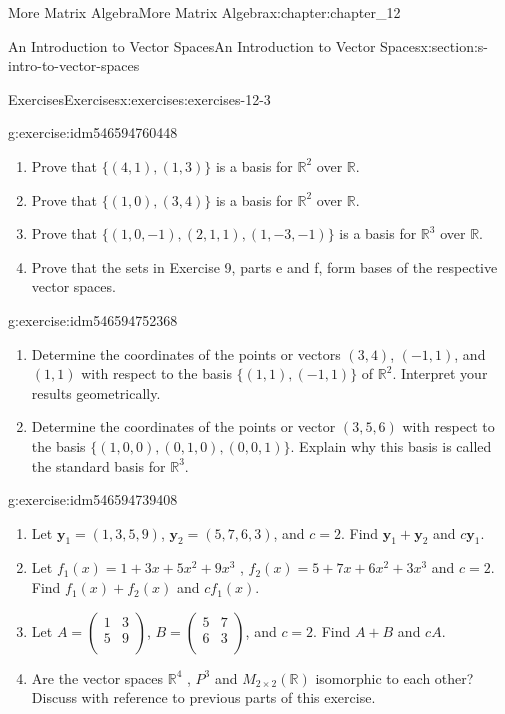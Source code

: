 \documentclass[oneside,10pt,]{book}
\numberwithin{equation}{section}
\renewcommand{\vec}[1]{\mathbf{#1}}
\begin{document}
\begin{chapterptx}{More Matrix Algebra}{}{More Matrix Algebra}{}{}{x:chapter:chapter_12}
\begin{sectionptx}{An Introduction to Vector Spaces}{}{An Introduction to Vector Spaces}{}{}{x:section:s-intro-to-vector-spaces}
\begin{exercises-subsection}{Exercises}{}{Exercises}{}{}{x:exercises:exercises-12-3}
\begin{divisionexercise}{11}{}{}{g:exercise:idm546594760448}
\begin{enumerate}[label=(\alph*)]
\item{}Prove that \(\{(4, 1), (1, 3)\}\) is a basis for \(\mathbb{R}^2\) over \(\mathbb{R}\).%
\item{}Prove that \(\{(1, 0), (3, 4)\}\) is a basis for \(\mathbb{R}^2\) over \(\mathbb{R}\).%
\item{}Prove that \(\{(1,0, -1), (2, 1, 1), (1, -3, -1)\}\) is a basis for \(\mathbb{R}^3\) over \(\mathbb{R}\).%
\item{}Prove that the sets in Exercise 9, parts e and f, form bases of the respective vector spaces.%
\end{enumerate}
%
\end{divisionexercise}%
\begin{divisionexercise}{12}{}{}{g:exercise:idm546594752368}%
%
\begin{enumerate}[label=(\alph*)]
\item{}Determine the coordinates of the points or vectors \((3, 4)\), \((-1, 1)\), and \((1, 1)\) with respect to the basis \(\{(1, 1),(-1, 1)\}\) of \(\mathbb{R}^2\). Interpret your results geometrically.%
\item{}Determine the coordinates of the points or vector \((3, 5, 6)\) with respect to the basis \(\{(1, 0, 0), (0, 1, 0), (0, 0, 1)\}\). Explain why this basis is called the standard basis for \(\mathbb{R}^3\).%
\end{enumerate}
%
\end{divisionexercise}%
\begin{divisionexercise}{13}{}{}{g:exercise:idm546594739408}%
%
\begin{enumerate}[label=(\alph*)]
\item{}Let \(\vec{y}_1= (1,3, 5, 9)\),  \(\vec{y}_2= (5,7, 6, 3)\), and \(c = 2\).  Find \(\vec{y}_1+\vec{y}_2\) and \(c \vec{y}_1\).%
\item{}Let  \(f_1(x) = 1 + 3x + 5x^2 + 9x^3\) , \(f_2(x)=5 + 7x+6x^2+3x^3\) and \(c = 2\). Find \(f_1(x)+f_2(x)\) and \(c f_1(x)\).%
\item{}Let \(A =\left(
\begin{array}{cc}
1 & 3 \\
5 & 9 \\
\end{array}
\right)\), \(B=\left(
\begin{array}{cc}
5 & 7 \\
6 & 3 \\
\end{array}
\right)\), and \(c=2\). Find \(A + B\) and \(c A\).%
\item{}Are the vector spaces \(\mathbb{R}^4\) , \(P^3\) and \(M_{2\times 2}(\mathbb{R})\) isomorphic to each other? Discuss with reference to previous parts of this exercise.%

\end{enumerate}
\end{divisionexercise}
\end{exercises-subsection}
\end{sectionptx}
\end{chapterptx}
\end{document}
